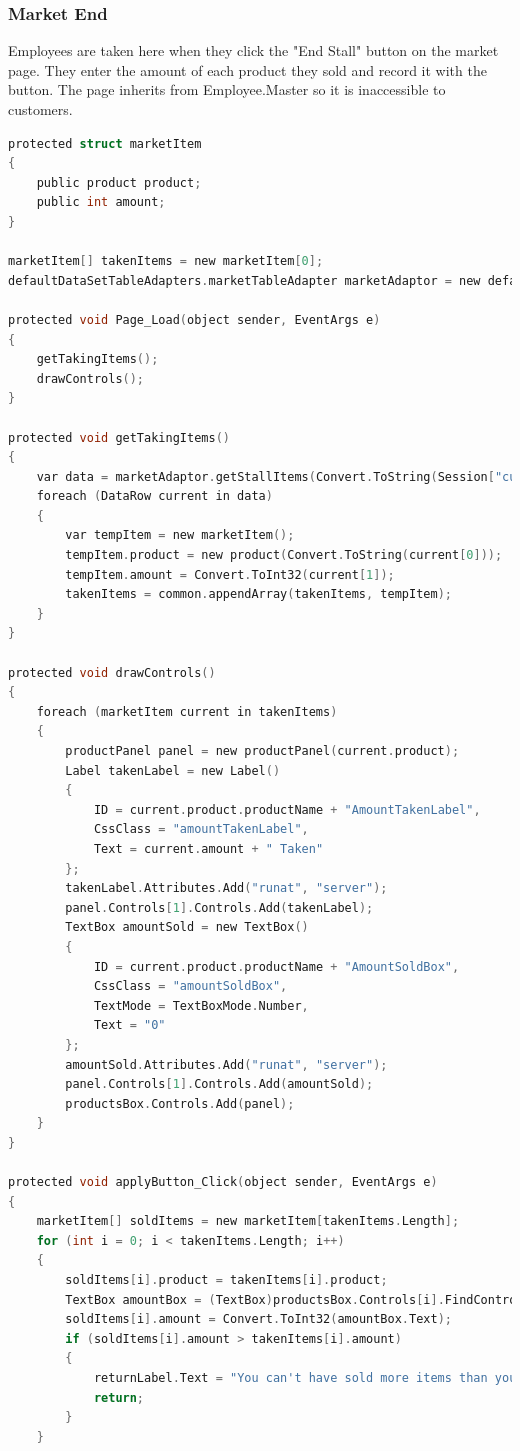 ﻿\documentclass{article}
\begin{document}
    \subsubsection{Market End}
    Employees are taken here when they click the "End Stall" button on the market page.
    They enter the amount of each product they sold and record it with the button.
    The page inherits from Employee.Master so it is inaccessible to customers.
    \begin{lstlisting}[language=C]
protected struct marketItem
{
    public product product;
    public int amount;
}

marketItem[] takenItems = new marketItem[0];
defaultDataSetTableAdapters.marketTableAdapter marketAdaptor = new defaultDataSetTableAdapters.marketTableAdapter();

protected void Page_Load(object sender, EventArgs e)
{
    getTakingItems();
    drawControls();
}

protected void getTakingItems()
{
    var data = marketAdaptor.getStallItems(Convert.ToString(Session["currentUser"]));
    foreach (DataRow current in data)
    {
        var tempItem = new marketItem();
        tempItem.product = new product(Convert.ToString(current[0]));
        tempItem.amount = Convert.ToInt32(current[1]);
        takenItems = common.appendArray(takenItems, tempItem);
    }
}

protected void drawControls()
{
    foreach (marketItem current in takenItems)
    {
        productPanel panel = new productPanel(current.product);
        Label takenLabel = new Label()
        {
            ID = current.product.productName + "AmountTakenLabel",
            CssClass = "amountTakenLabel",
            Text = current.amount + " Taken"
        };
        takenLabel.Attributes.Add("runat", "server");
        panel.Controls[1].Controls.Add(takenLabel);
        TextBox amountSold = new TextBox()
        {
            ID = current.product.productName + "AmountSoldBox",
            CssClass = "amountSoldBox",
            TextMode = TextBoxMode.Number,
            Text = "0"
        };
        amountSold.Attributes.Add("runat", "server");
        panel.Controls[1].Controls.Add(amountSold);
        productsBox.Controls.Add(panel);
    }
}

protected void applyButton_Click(object sender, EventArgs e)
{
    marketItem[] soldItems = new marketItem[takenItems.Length];
    for (int i = 0; i < takenItems.Length; i++)
    {
        soldItems[i].product = takenItems[i].product;
        TextBox amountBox = (TextBox)productsBox.Controls[i].FindControl(takenItems[i].product.productName + "AmountSoldBox");
        soldItems[i].amount = Convert.ToInt32(amountBox.Text);
        if (soldItems[i].amount > takenItems[i].amount)
        {
            returnLabel.Text = "You can't have sold more items than you took!";
            return;
        }
    }


\end{lstlisting}
\end{document}
